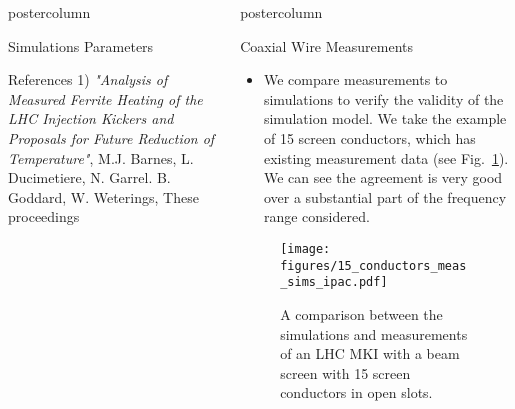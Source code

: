 \documentclass[final,hyperref={pdfpagelabels=false}]{beamer}
\newlength{\columnheight}
\begin{document}
\begin{frame}
\begin{columns}
\begin{column}{.49\textwidth}
\begin{beamercolorbox}[center,wd=\textwidth]{postercolumn}
\begin{minipage}[T]{.95\textwidth}
{\begin{block}{Simulations Parameters}
\end{block}
            \vfill

\begin{block}{References}
\small{1) \emph{"Analysis of Measured Ferrite Heating of the LHC Injection Kickers and Proposals for Future Reduction of Temperature"}, M.J. Barnes, L. Ducimetiere, N. Garrel. B. Goddard, W. Weterings, These proceedings}

\end{block}

           \vfill
         \vfill
          }
        \end{minipage}
      \end{beamercolorbox}
    \end{column}

    \begin{column}{.49\textwidth}
      \begin{beamercolorbox}[center,wd=\textwidth]{postercolumn}
        \begin{minipage}[T]{.95\textwidth} %
          \parbox[t][\columnheight]{\textwidth}{ %
\begin{block}{Coaxial Wire Measurements}
\begin{itemize}
\item{We compare measurements to simulations to verify the validity of the simulation model. We take the example of 15 screen conductors, which has existing measurement data (see Fig.~\ref{fig:meas_sim_comp}). We can see the agreement is very good over a substantial part of the frequency range considered.}
\end{itemize}
\begin{figure}
\texttt{[image: figures/15\_conductors\_meas\_sims\_ipac.pdf]}
\caption{A comparison between the simulations and measurements of an LHC MKI with a beam screen with 15 screen conductors in open slots.}
\label{fig:meas_sim_comp}
\end{figure}


\end{block}
\vfill

}
\end{minipage}
\end{beamercolorbox}
\end{column}
\end{columns}
\end{frame}
\end{document}
